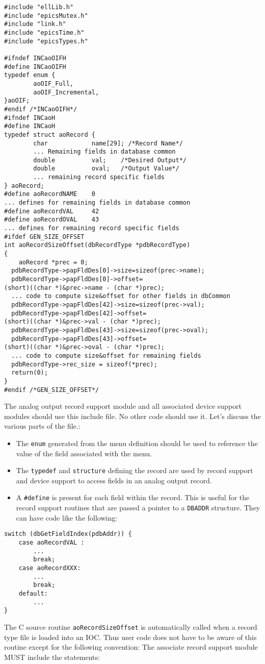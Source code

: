 \begin{verbatim}#include "ellLib.h"
#include "epicsMutex.h"
#include "link.h"
#include "epicsTime.h"
#include "epicsTypes.h"

#ifndef INCaoOIFH
#define INCaoOIFH
typedef enum {
        aoOIF_Full,
        aoOIF_Incremental,
}aoOIF;
#endif /*INCaoOIFH*/
#ifndef INCaoH
#define INCaoH
typedef struct aoRecord {
        char            name[29]; /*Record Name*/
        ... Remaining fields in database common
        double          val;    /*Desired Output*/
        double          oval;   /*Output Value*/
        ... remaining record specific fields
} aoRecord;
#define aoRecordNAME    0
... defines for remaining fields in database common
#define aoRecordVAL     42
#define aoRecordOVAL    43
... defines for remaining record specific fields
#ifdef GEN_SIZE_OFFSET
int aoRecordSizeOffset(dbRecordType *pdbRecordType)
{
    aoRecord *prec = 0;
  pdbRecordType->papFldDes[0]->size=sizeof(prec->name);
  pdbRecordType->papFldDes[0]->offset=
(short)((char *)&prec->name - (char *)prec);
  ... code to compute size&offset for other fields in dbCommon
  pdbRecordType->papFldDes[42]->size=sizeof(prec->val);
  pdbRecordType->papFldDes[42]->offset=
(short)((char *)&prec->val - (char *)prec);
  pdbRecordType->papFldDes[43]->size=sizeof(prec->oval);
  pdbRecordType->papFldDes[43]->offset=
(short)((char *)&prec->oval - (char *)prec);
  ... code to compute size&offset for remaining fields
  pdbRecordType->rec_size = sizeof(*prec);
  return(0);
}
#endif /*GEN_SIZE_OFFSET*/

\end{verbatim}The analog output record support module and all associated device support modules should use this include file. No other 
code should use it. Let's discuss the various parts of the file.:

\begin{itemize}\item The \verb|enum| generated from the menu definition should be used to reference the value of the field associated with the 
menu.

\item The \verb|typedef| and \verb|structure| defining the record are used by record support and device support to access fields 
in an analog output record.

\item A \verb|#define| is present for each field within the record. This is useful for the record support routines that are passed 
a pointer to a \verb|DBADDR| structure. They can have code like the following:

\end{itemize}\begin{verbatim}
switch (dbGetFieldIndex(pdbAddr)) {
    case aoRecordVAL :
        ...
        break;
    case aoRecordXXX:
        ...
        break;
    default:
        ...
}
\end{verbatim}The C source routine \verb|aoRecordSizeOffset| is automatically called when a record type file is loaded into an IOC. 
Thus user code does not have to be aware of this routine except for the following convention: The associate record 
support module MUST include the statements:

